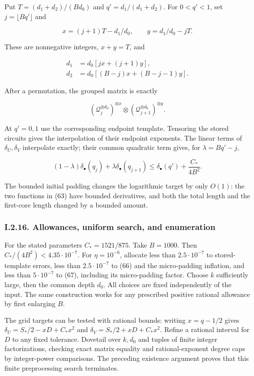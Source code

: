Put \(T=(d_1+d_2)/(Bd_0)\) and \(q'=d_1/(d_1+d_2)\). For \(0<q'<1\), set \(j=\lfloor Bq'\rfloor\) and

\[
x=(j+1)T-d_1/d_0,\qquad y=d_1/d_0-jT.
\]

These are nonnegative integers, \(x+y=T\), and

\[
\begin{aligned}
d_1&=d_0[jx+(j+1)y],\\
d_2&=d_0[(B-j)x+(B-j-1)y].
\end{aligned}
\]

After a permutation, the grouped matrix is exactly

\[
(\mathcal Q_j^{\otimes d_0})^{\otimes x}
\otimes(\mathcal Q_{j+1}^{\otimes d_0})^{\otimes y}.
\]

At \(q'=0,1\) use the corresponding endpoint template. Tensoring the stored circuits gives the interpolation of their endpoint exponents. The linear terms of \(\delta_U,\delta_V\) interpolate exactly; their common quadratic term gives, for \(\lambda=Bq'-j\),

\[
(1-\lambda)\delta_\bullet(q_j)+\lambda\delta_\bullet(q_{j+1})
\le\delta_\bullet(q')+\frac{C_*}{4B^2}.
\tag{67}
\]

The bounded initial padding changes the logarithmic target by only \(O(1)\): the two functions in (63) have bounded derivatives, and both the total length and the first-core length changed by a bounded amount.

\hypertarget{af-a9ec399514-i.2.16.-allowances-uniform-search-and-enumeration}{%
\subsubsection{I.2.16. Allowances, uniform search, and enumeration}\label{af-a9ec399514-i.2.16.-allowances-uniform-search-and-enumeration}}

For the stated parameters \(C_*=1521/875\). Take \(B=1000\). Then \(C_*/(4B^2)<4.35\cdot10^{-7}\). For \(\eta=10^{-6}\), allocate less than \(2.5\cdot10^{-7}\) to stored-template errors, less than \(2.5\cdot10^{-7}\) to (66) and the micro-padding inflation, and less than \(5\cdot10^{-7}\) to (67), including its micro-padding factor. Choose \(k\) sufficiently large, then the common depth \(d_0\). All choices are fixed independently of the input. The same construction works for any prescribed positive rational allowance by first enlarging \(B\).

The grid targets can be tested with rational bounds: writing \(x=q-1/2\) gives \(\delta_U=S_*/2-xD+C_*x^2\) and \(\delta_V=S_*/2+xD+C_*x^2\). Refine a rational interval for \(D\) to any fixed tolerance. Dovetail over \(k,d_0\) and tuples of finite integer factorizations, checking exact matrix equality and rational-exponent degree caps by integer-power comparisons. The preceding existence argument proves that this finite preprocessing search terminates.

